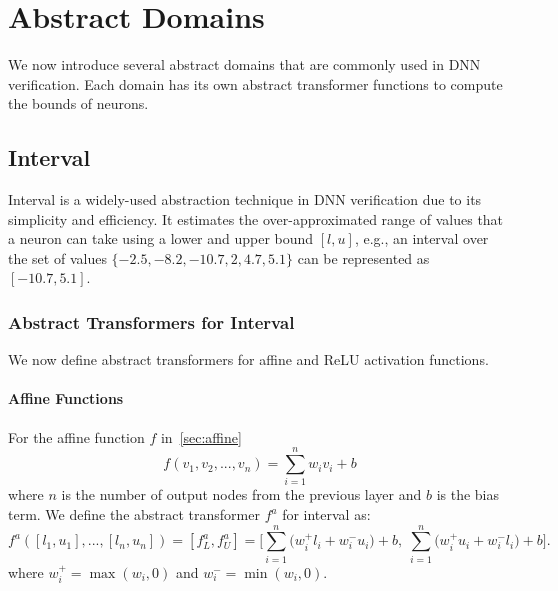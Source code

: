 \documentclass[oneside,11pt,dvipsnames]{book}
\numberwithin{equation}{section}
\theoremstyle{definition}
\theoremstyle{remark}
\begin{document}
\section{Abstract Domains}\label{sec:abstract-domains}

We now introduce several abstract domains that are commonly used in DNN verification. Each domain has its own abstract transformer functions to compute the bounds of neurons.

\subsection{Interval}\label{sec:interval-abstraction}

Interval is a widely-used abstraction technique in DNN verification due to its simplicity and efficiency. It estimates the over-approximated range of values that a neuron can take using a lower and upper bound $[l, u]$, e.g., an interval over the set of values $\{-2.5, -8.2, -10.7, 2, 4.7, 5.1\}$ can be represented as $[-10.7, 5.1]$.

\subsubsection{Abstract Transformers for Interval}

We now define abstract transformers for affine and ReLU activation functions.

\paragraph{Affine Functions} For the affine function \(f\) in~\autoref{sec:affine}
\[f(v_1, v_2, ...,v_n) = \sum_{i=1}^{n} w_i v_i + b\]
where $n$ is the number of output nodes from the previous layer and \(b\) is the bias term. We define the abstract transformer \(f^a\) for interval as:
\[
f^{a}([l_1, u_1],..., [l_n, u_n]) = [f^a_L, f^a_U] = 
\Bigg[\sum_{i=1}^{n}\big(w_i^{+} l_i + w_i^{-} u_i\big) + b,\; \sum_{i=1}^{n}\big(w_i^{+} u_i + w_i^{-} l_i\big) + b\Bigg].
\]
where \(w_i^{+} = \max(w_i, 0)\) and \(w_i^{-} = \min(w_i, 0)\).
\end{document}
